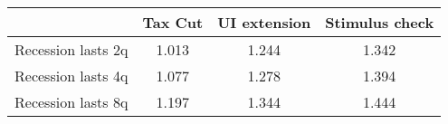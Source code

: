 \begin{tabular}{@{}lccc@{}} 
\toprule 
& Tax Cut    & UI extension    & Stimulus check    \\  \midrule 
Recession lasts 2q &1.013  & 1.244  & 1.342     \\ 
Recession lasts 4q &1.077  & 1.278  & 1.394     \\ 
Recession lasts 8q &1.197  & 1.344  & 1.444     \\ 
\end{tabular}  

